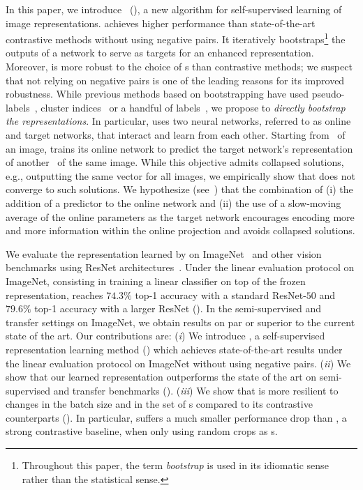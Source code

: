 In this paper, we introduce \longalgo~(\algo), a new algorithm for self-supervised learning of image representations. \algo achieves higher performance than state-of-the-art contrastive methods without using negative pairs. It iteratively bootstraps\footnote{Throughout this paper, the term \emph{bootstrap} is used in its idiomatic sense rather than the statistical sense.} the outputs of a network to serve as targets for an enhanced representation.
Moreover, \algo is more robust to the choice of \imageaugmentation s than contrastive methods; we suspect that not relying on negative pairs is one of the leading reasons for its improved robustness. While previous methods based on bootstrapping have used pseudo-labels~\cite{lee2013PseudoLabelT}, cluster indices~\cite{caron2018DeepCF} or a handful of labels~\cite{bachman2014learning, laine2016temporal, tarvainen2017mean}, 
we propose to \textit{directly bootstrap the representations}. In particular, \algo uses two neural networks, referred to as online and target networks, that interact and learn from each other. Starting from \aaugview~of an image, \algo trains its online network to predict the target network's representation of another \augview~of the same image. 
While this objective admits collapsed solutions, e.g., outputting the same vector for all images, we empirically show that \algo does not converge to such solutions. 
We hypothesize (see~) that the combination of
(i) the addition of a predictor to the online network 
and (ii) the use of a slow-moving average of the online parameters as the target network encourages encoding more and more information within the online projection and avoids collapsed solutions.

We evaluate the representation learned by \algo on ImageNet~\cite{ILSVRC15} and other vision benchmarks using ResNet architectures~\cite{ResNet}. Under the linear evaluation protocol on ImageNet, consisting in training a linear classifier on top of the frozen representation, \algo reaches $74.3\%$ top-1 accuracy with a standard ResNet-$50$ and $79.6\%$ top-1 accuracy with a larger ResNet (). 
In the semi-supervised and transfer settings on ImageNet, we obtain results on par or superior to the current state of the art. Our contributions are: (\textit{i}) We introduce \algo, a self-supervised representation learning method () which achieves state-of-the-art results under the linear evaluation protocol on ImageNet without using negative pairs. (\textit{ii}) We show that our learned representation outperforms the state of the art on semi-supervised and transfer benchmarks (). (\textit{iii}) We show that \algo is more resilient to changes in the batch size and in the set of \imageaugmentation s compared to its contrastive counterparts ().
In particular, \algo suffers a much smaller performance drop than \simclr, a strong contrastive baseline, when only using random crops as \imageaugmentation s.
